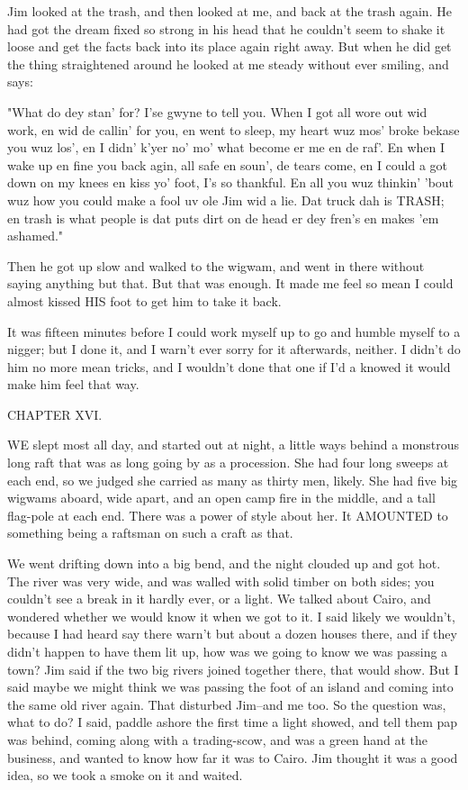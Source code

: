 Jim looked at the trash, and then looked at me, and back at the trash
again.  He had got the dream fixed so strong in his head that he couldn't
seem to shake it loose and get the facts back into its place again right
away.  But when he did get the thing straightened around he looked at me
steady without ever smiling, and says:

"What do dey stan' for?  I'se gwyne to tell you.  When I got all wore out
wid work, en wid de callin' for you, en went to sleep, my heart wuz mos'
broke bekase you wuz los', en I didn' k'yer no' mo' what become er me en
de raf'.  En when I wake up en fine you back agin, all safe en soun', de
tears come, en I could a got down on my knees en kiss yo' foot, I's so
thankful. En all you wuz thinkin' 'bout wuz how you could make a fool uv
ole Jim wid a lie.  Dat truck dah is TRASH; en trash is what people is
dat puts dirt on de head er dey fren's en makes 'em ashamed."

Then he got up slow and walked to the wigwam, and went in there without
saying anything but that.  But that was enough.  It made me feel so mean
I could almost kissed HIS foot to get him to take it back.

It was fifteen minutes before I could work myself up to go and humble
myself to a nigger; but I done it, and I warn't ever sorry for it
afterwards, neither.  I didn't do him no more mean tricks, and I wouldn't
done that one if I'd a knowed it would make him feel that way.




CHAPTER XVI.

WE slept most all day, and started out at night, a little ways behind a
monstrous long raft that was as long going by as a procession.  She had
four long sweeps at each end, so we judged she carried as many as thirty
men, likely.  She had five big wigwams aboard, wide apart, and an open
camp fire in the middle, and a tall flag-pole at each end.  There was a
power of style about her.  It AMOUNTED to something being a raftsman on
such a craft as that.

We went drifting down into a big bend, and the night clouded up and got
hot.  The river was very wide, and was walled with solid timber on both
sides; you couldn't see a break in it hardly ever, or a light.  We talked
about Cairo, and wondered whether we would know it when we got to it.  I
said likely we wouldn't, because I had heard say there warn't but about a
dozen houses there, and if they didn't happen to have them lit up, how
was we going to know we was passing a town?  Jim said if the two big
rivers joined together there, that would show.  But I said maybe we might
think we was passing the foot of an island and coming into the same old
river again. That disturbed Jim--and me too.  So the question was, what
to do?  I said, paddle ashore the first time a light showed, and tell
them pap was behind, coming along with a trading-scow, and was a green
hand at the business, and wanted to know how far it was to Cairo.  Jim
thought it was a good idea, so we took a smoke on it and waited.

